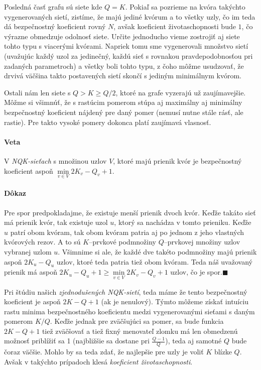 Posledná časť grafu sú siete kde $Q=K$. Pokiaľ sa pozrieme na kvóra takýchto
vygenerovaných sietí, zistíme, že majú jediné kvórum a to všetky uzly, čo im
teda dá bezpečnostný koeficient rovný $N$, avšak koeficient životaschopnosti
bude $1$, čo výrazne obmedzuje odolnosť siete.
Určite jednoducho vieme zostrojiť aj siete tohto typu s viacerými kvórami.
Napriek tomu sme vygenerovali množstvo sietí (uvažujúc každý uzol za jedinečný,
každú sieť s rovnakou pravdepodobnosťou pri zadaných parametroch) a všetky boli
tohto typu, z čoho môžme usudzovať, že drvivá väčšina takto postavených sietí
skončí s jediným minimálnym kvórom.

Ostali nám len siete s $Q > K\geq Q/2$, ktoré na grafe vyzerajú už zaujímavejšie.
Môžme si všimnúť, že s rastúcim pomerom stúpa aj maximálny aj minimálny
bezpečnostný koeficient nájdený pre daný pomer (nemusí nutne stále rásť, ale
 rastie).
Pre takto vysoké pomery dokonca platí zaujímavá vlasnosť.

\paragraph{Veta}
V \textit{NQK-sieťach} s množinou uzlov $V$, ktoré majú prienik kvór je bezpečnostný
koeficient aspoň $\min\limits_{v\in V}2K_v-Q_v+1$.

\paragraph{Dôkaz}
Pre spor predpokladajme, že existuje menší prienik dvoch kvór.
Keďže takáto sieť má prienik kvór, tak existuje uzol $u$, ktorý sa nachádza v tomto
prieniku. Keďže $u$ patrí obom kvóram, tak obom kvóram patria aj po jednom z jeho
vlastných kvórových rezov. A to sú $K$--prvkové podmnožiny $Q$--prvkovej množiny uzlov
vybranej uzlom $u$. Všimnime si ale, že každé dve takéto podmnožiny majú prienik aspoň
$2K_u-Q_u$ uzlov, ktoré teda patria tiež obom kvóram. Teda náš uvažovaný prienik má
aspoň $2K_u-Q_u+1\geq\min\limits_{v\in V}2K_v-Q_v+1$ uzlov, čo je spor.$\blacksquare$

\vspace{3mm}
Pri štúdiu našich \textit{zjednodušených NQK-sietí}, teda máme že tento bezpečnostný
koeficient je aspoň $2K-Q+1$ (ak je nenulový). Týmto môžeme získať intuíciu rastu
minima bezpečnostného koeficientu medzi vygenerovanými sieťami s daným pomerom $K/Q$.
Keďže jednak pre zväčšujúci sa pomer, sa bude funkcia $2K-Q+1$ tiež zväčšovať a tiež
fixný menovateľ zlomku má len obmedzenú možnosť priblížiť sa 1 (najbližšie sa dostane pri
$\frac{Q-1}{Q}$), teda aj samotné $Q$ bude čoraz väčšie. Mohlo by sa teda zdať, že
najlepšie pre uzly je voliť $K$ blízke $Q$. Avšak v takýchto prípadoch klesá
\textit{koeficient životaschopnosti}.

